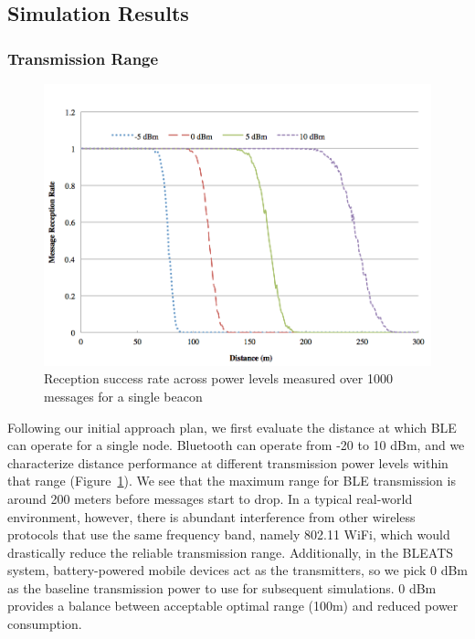 \subsection{Simulation Results}

\subsubsection{Transmission Range}

\begin{figure} \centering
\includegraphics[width=\columnwidth]{figures/distance-error.png}
\caption{Reception success rate across power levels measured over 1000 messages for a single beacon}
\label{fig:distance-error} \end{figure}

Following our initial approach plan, we first evaluate the distance at which
BLE can operate for a single node. Bluetooth can operate from -20 to 10 dBm,
and we characterize distance performance at different transmission power levels
within that range (Figure~\ref{fig:distance-error}). We see that the maximum
range for BLE transmission is around 200 meters before messages start to drop.
In a typical real-world environment, however, there is abundant interference
from other wireless protocols that use the same frequency band, namely 802.11
WiFi, which would drastically reduce the reliable transmission range.
Additionally, in the BLEATS system, battery-powered mobile devices act as the
transmitters, so we pick 0 dBm as the baseline transmission power to use for
subsequent simulations. 0 dBm provides a balance between acceptable optimal range (100m) and
reduced power consumption.

